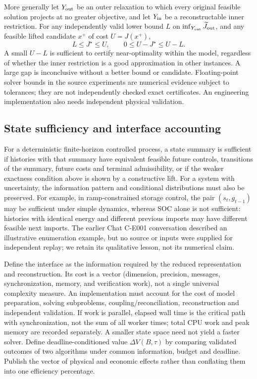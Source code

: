 \documentclass[11pt,letterpaper]{article}
\begin{document}
More generally let $Y_{\rm out}$ be an outer relaxation to which every original feasible solution projects at no greater objective, and let $Y_{\rm in}$ be a reconstructable inner restriction. For any independently valid lower bound $L$ on $\inf_{Y_{\rm out}}\widetilde J_{\rm out}$, and any feasible lifted candidate $x^+$ of cost $U=J(x^+)$,
\begin{equation}
L\le J^\star\le U,\qquad 0\le U-J^\star\le U-L.\label{eq:sandwich}
\end{equation}
A small $U-L$ is sufficient to certify near-optimality within the model, regardless of whether the inner restriction is a good approximation in other instances. A large gap is inconclusive without a better bound or candidate. Floating-point solver bounds in the source experiments are numerical evidence subject to tolerances; they are not independently checked exact certificates. An engineering implementation also needs independent physical validation.

\subsection{State sufficiency and interface accounting}
For a deterministic finite-horizon controlled process, a state summary is sufficient if histories with that summary have equivalent feasible future controls, transitions of the summary, future costs and terminal admissibility, or if the weaker exactness condition above is shown by a constructive lift. For a system with uncertainty, the information pattern and conditional distributions must also be preserved. For example, in ramp-constrained storage control, the pair $(s_t,g_{t-1})$ may be sufficient under simple dynamics, whereas SOC alone is not sufficient: histories with identical energy and different previous imports may have different feasible next imports. The earlier Chat C-E001 conversation described an illustrative enumeration example, but no source or inputs were supplied for independent replay; we retain its qualitative lesson, not its numerical claim.

Define the interface as the information required by the reduced representation and reconstruction. Its cost is a vector (dimension, precision, messages, synchronization, memory, and verification work), not a single universal complexity measure. An implementation must account for the cost of model preparation, solving subproblems, coupling/reconciliation, reconstruction and independent validation. If work is parallel, elapsed wall time is the critical path with synchronization, not the sum of all worker times; total CPU work and peak memory are recorded separately. A smaller state space need not yield a faster solver. Define deadline-conditioned value $\Delta V(B,\tau)$ by comparing validated outcomes of two algorithms under common information, budget and deadline. Publish the vector of physical and economic effects rather than conflating them into one efficiency percentage.
\end{document}
